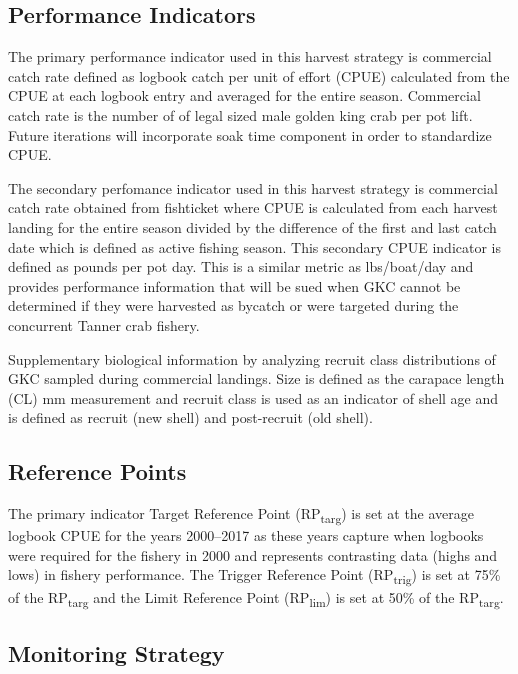 \documentclass[]{article}
\begin{document}
\subsection*{Performance Indicators}\label{performance-indicators}

The primary performance indicator used in this harvest strategy is
commercial catch rate defined as logbook catch per unit of effort (CPUE)
calculated from the CPUE at each logbook entry and averaged for the
entire season. Commercial catch rate is the number of of legal sized
male golden king crab per pot lift. Future iterations will incorporate
soak time component in order to standardize CPUE.

The secondary perfomance indicator used in this harvest strategy is
commercial catch rate obtained from fishticket where CPUE is calculated
from each harvest landing for the entire season divided by the
difference of the first and last catch date which is defined as active
fishing season. This secondary CPUE indicator is defined as pounds per
pot day. This is a similar metric as lbs/boat/day and provides
performance information that will be sued when GKC cannot be determined
if they were harvested as bycatch or were targeted during the concurrent
Tanner crab fishery.

Supplementary biological information by analyzing recruit class
distributions of GKC sampled during commercial landings. Size is defined
as the carapace length (CL) mm measurement and recruit class is used as
an indicator of shell age and is defined as recruit (new shell) and
post-recruit (old shell).

\subsection*{Reference Points}\label{reference-points}

The primary indicator Target Reference Point (RP\textsubscript{targ}) is
set at the average logbook CPUE for the years 2000--2017 as these years
capture when logbooks were required for the fishery in 2000 and
represents contrasting data (highs and lows) in fishery performance. The
Trigger Reference Point (RP\textsubscript{trig}) is set at 75\% of the
RP\textsubscript{targ} and the Limit Reference Point
(RP\textsubscript{lim}) is set at 50\% of the RP\textsubscript{targ}.

\subsection*{Monitoring Strategy}\label{monitoring-strategy}
\end{document}
